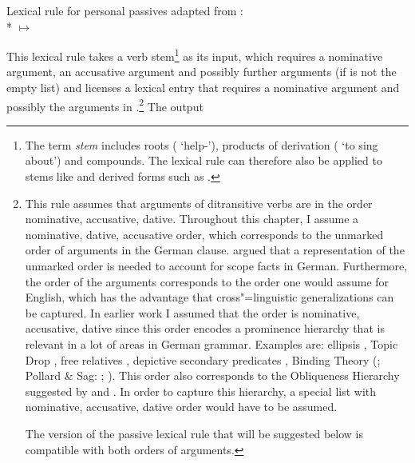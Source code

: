 \ea
\label{pass-lr-mlr}
Lexical rule for personal passives adapted from \citet{Kiss92}:\\*
 $\mapsto$ \\
\flushright{}
\z

\noindent
This lexical rule takes a verb stem\footnote{%
	The term \emph{stem} includes roots ( `help-'), products of derivation
        ( `to sing about') and compounds. The lexical rule can therefore also be applied to
        stems like  and derived forms such as .%
} as its input, which requires a nominative argument, an accusative argument and possibly further arguments (if  is not the empty
list) and licenses a lexical entry that requires a nominative argument and possibly the arguments in
.\footnote{%
  This rule assumes that arguments of ditransitive verbs are in the order nominative, accusative,
  dative. Throughout this chapter, I assume a nominative, dative, accusative order, which
  corresponds to the unmarked order of arguments in the German clause. \citet{Kiss2001a} argued that
  a representation of the unmarked order is needed to account for scope facts in
  German. Furthermore, the order of the arguments corresponds to the order one would assume for
  English, which has the advantage that cross"=linguistic generalizations can be captured. In
  earlier work I assumed that the order is nominative, accusative, dative since this order encodes a
  prominence hierarchy that is relevant in a lot of areas in German grammar. Examples are: ellipsis \citep{Klein85},
  Topic Drop \citep{Fries88b}, free relatives
  \citep{Bausewein90,Pittner95b,Mueller99b},
  depictive secondary predicates \citep{Mueller2001c,Mueller2002b,Mueller2008a},
  Binding Theory (\citealp{Grewendorf85a}; Pollard \& Sag: \citeyear{PS92};
  \citeyear[Chapter~6]{ps2}). This order also corresponds to the Obliqueness
  Hierarchy suggested by \citet{KC77a} and \citet{Pullum77a}. In order to capture
  this hierarchy, a special list with nominative, accusative, dative order would have to be assumed.

  The version of the passive lexical rule that will be suggested below is compatible with both orders of arguments.
} The output
